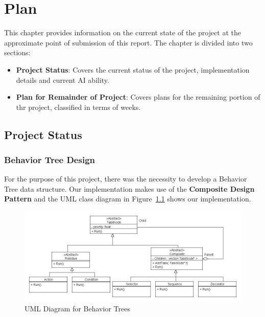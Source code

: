 \chapter{Plan}
    
    This chapter provides information on the current state of the project at the approximate point of submission of this report. The chapter is divided into two sections:
    
    \begin{itemize}
    \item \textbf{Project Status}: Covers the current status of the project, implementation details and current AI ability.
    \item \textbf{Plan for Remainder of Project}: Covers plans for the remaining portion of thr project, classified in terms of weeks.
    \end{itemize}

    \section{Project Status}
    
    \subsection{Behavior Tree Design}
    
    For the purpose of this project, there was the necessity to develop a Behavior Tree data structure. Our implementation makes use of the \textbf{Composite Design Pattern} and the UML class diagram in Figure~\ref{img:uml_bt} shows our implementation. 

    \begin{figure}[h]                
        \begin{center}
            \includegraphics[scale=0.45]{images/uml_bt.jpg}
            \caption{UML Diagram for Behavior Trees}
            \label{img:uml_bt}
        \end{center}            
    \end{figure}
    
